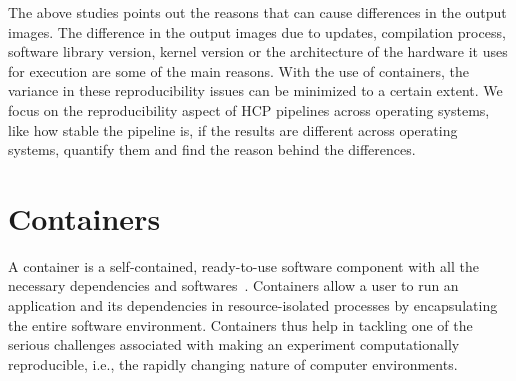 The above studies points out the reasons that can cause differences in the output images. The difference in the output images due to updates, compilation process, software library version, kernel version or the architecture of the hardware it uses for execution are some of the main reasons. With the use of containers, the variance in these reproducibility issues can be minimized to a certain extent. We focus on the reproducibility aspect of HCP pipelines across operating systems, like how stable the pipeline is, if the results are different across operating systems, quantify them and find the reason behind the differences.

\section{Containers}
A container is a self-contained, ready-to-use software component with all the necessary dependencies and softwares~\cite{7158965}. Containers allow a user to run an application and its dependencies in resource-isolated processes by encapsulating the entire software environment. Containers thus help in tackling one of the serious challenges associated with making an experiment computationally reproducible, i.e., the rapidly changing nature of computer environments.
